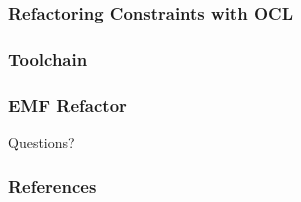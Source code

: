 \documentclass{beamer}
\begin{document}
\begin{frame}
\frametitle{Refactoring Constraints with OCL}

\end{frame}
        
\begin{frame}
\frametitle{Toolchain}
        
\end{frame}
        
\begin{frame}
\frametitle{EMF Refactor}
        
\end{frame}
        

\begin{frame}
 \begin{center}
\Huge Questions?
\end{center}
\end{frame}

\begin{frame}
 \frametitle{References}
 
 
\end{frame}
\end{document}
